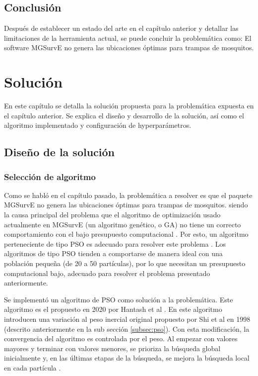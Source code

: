 \section{Conclusión}
  Después de establecer un estado del arte en el capítulo anterior y detallar
  las limitaciones de la herramienta actual, se puede concluir la problemática
  como: El software MGSurvE no genera las ubicaciones óptimas para trampas de
  mosquitos. 

\chapter{Solución}\label{chap:solucion}
En este capítulo se detalla la solución propuesta para la problemática
expuesta en el capítulo anterior. Se explica el diseño y desarrollo de la
solución, así como el algoritmo implementado y configuración de
hyperparámetros.

\section{Diseño de la solución}
  \subsection{Selección de algoritmo}
  Como se habló en el capítulo pasado, la problemática a resolver es que el
  paquete MGSurvE no genera las ubicaciones óptimas para trampas de mosquitos.
  siendo la causa principal del
  problema que el algoritmo de optimización usado actualmente en MGSurvE
  (un algoritmo genético, o GA) no tiene un correcto comportamiento con el
  bajo presupuesto computacional \cite{SwarmVsEvol}. Por esto, un algoritmo
  perteneciente de tipo PSO es adecuado para resolver
  este problema \cite{SwarmVsEvol,PSOPopulationSize}. Los algoritmos de tipo
  PSO tienden a comportarse de manera ideal con una población pequeña (de 20
  a 50 partículas), por lo que necesitan un presupuesto computacional bajo,
  adecuado para resolver el problema presentado anteriormente.

  Se implementó un algoritmo de PSO como solución a la problemática. Este
  algoritmo es el propuesto
  en 2020 por Hantash et al \cite{PSOEnergy}. En este algoritmo introducen una
  variación al peso inercial original propuesto por Shi et al \cite{CPSO} en
  1998 (descrito anteriormente en la sub sección \ref{subsec:pso}). Con esta
  modificación, la convergencia del algoritmo es controlada por el peso. Al 
  empezar con valores mayores y terminar con valores menores, se prioriza la
  búsqueda global inicialmente y, en las últimas etapas de la búsqueda, se
  mejora la búsqueda local en cada partícula \cite{CPSO}.

